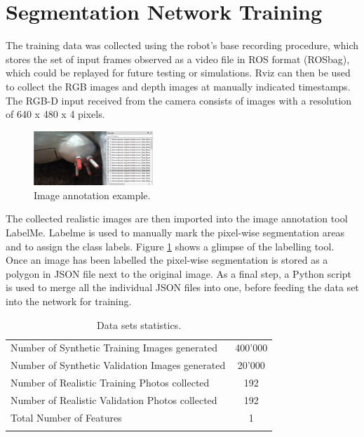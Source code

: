 \section{Segmentation Network Training}\label{chap:4:train_data}

The training data was collected using the robot's base recording procedure, which stores the set of input frames observed as a video file in ROS format (ROSbag), which could be replayed for future testing or simulations. Rviz can then be used to collect the RGB images and depth images at manually indicated timestamps. The RGB-D input received from the camera consists of images with a resolution of 640 x 480 x 4 pixels. 

\begin{figure}[h]
    \centering
    \includegraphics[width=0.4\textwidth]{images/cow_labelme.png}
    \caption{Image annotation example.}
    \label{fig:cow_labelme}
\end{figure}
The collected realistic images are then imported into the image annotation tool LabelMe\cite{2021labelme}. Labelme is used to manually mark the pixel-wise segmentation areas and to assign the class labels.  Figure \ref{fig:cow_labelme} shows a glimpse of the labelling tool. Once an image has been labelled the pixel-wise segmentation is stored as a polygon in JSON file next to the original image. As a final step, a Python script is used to merge all the individual JSON files into one, before feeding the data set into the network for training.

\begin{longtable}{@{} p{8cm} c @{}} \toprule
Number of Synthetic Training Images generated                   & 400'000 \\ \cmidrule{1-2}
Number of Synthetic Validation Images generated                   & 20'000 \\ \cmidrule{1-2}
Number of Realistic Training Photos collected             & 192 \\ \cmidrule{1-2}
Number of Realistic Validation Photos collected             & 192 \\ \cmidrule{1-2}
Total Number of Features                    & 1 \\ \bottomrule
\caption{Data sets statistics.} \label{tab:dataset-statistics} \\
\end{longtable}

